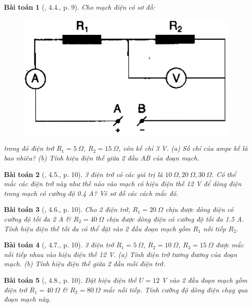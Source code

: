 \documentclass{article}
\newtheorem{baitoan}{Bài toán}
\begin{document}
\begin{baitoan}[\cite{SBT_Vat_Ly_9}, 4.4., p. 9]
	Cho mạch điện có sơ đồ:
	\begin{figure}[H]
		\centering
		\includegraphics[scale=0.25]{SBT_4.2}
	\end{figure}
	\noindent trong đó điện trở $R_1 = 5\ \Omega$, $R_2 = 15\ \Omega$, vôn kế chỉ \emph{3 V}. (a) Số chỉ của ampe kế là bao nhiêu? (b) Tính hiệu điện thế giữa 2 đầu \emph{AB} của đoạn mạch.
\end{baitoan}

\begin{baitoan}[\cite{SBT_Vat_Ly_9}, 4.5., p. 10]
	3 điện trở có các giá trị là $10\ \Omega,20\ \Omega, 30 \ \Omega$. Có thể mắc các điện trở này như thế nào vào mạch có hiệu điện thế \emph{12 V} để dòng điện trong mạch có cường độ \emph{0.4 A}? Vẽ sơ đồ các cách mắc đó.
\end{baitoan}

\begin{baitoan}[\cite{SBT_Vat_Ly_9}, 4.6., p. 10]
	Cho 2 điện trở, $R_1 = 20\ \Omega$ chịu được dòng điện có cường độ tối đa \emph{2 A} \& $R_2 = 40\ \Omega$ chịu được dòng điện có cường độ tối đa \emph{1.5 A}. Tính hiệu điện thế tối đa có thể đặt vào 2 đầu đoạn mạch gồm $R_1$ nối tiếp $R_2$.
\end{baitoan}

\begin{baitoan}[\cite{SBT_Vat_Ly_9}, 4.7., p. 10]
	3 điện trở $R_1 = 5\ \Omega$, $R_2 = 10\ \Omega$, $R_3 = 15\ \Omega$ được mắc nối tiếp nhau vào hiệu điện thế \emph{12 V}. (a) Tính điện trở tương đương của đoạn mạch. (b) Tính hiệu điện thế giữa 2 đầu mỗi điện trở.
\end{baitoan}

\begin{baitoan}[\cite{SBT_Vat_Ly_9}, 4.8., p. 10]
	Đặt hiệu điện thế $U = 12$ \emph{V} vào 2 đầu đoạn mạch gồm điện trở $R_1 = 40\ \Omega$ \& $R_2 = 80\ \Omega$ mắc nối tiếp. Tính cường độ dòng điện chạy qua đoạn mạch này.
\end{baitoan}
\end{document}
